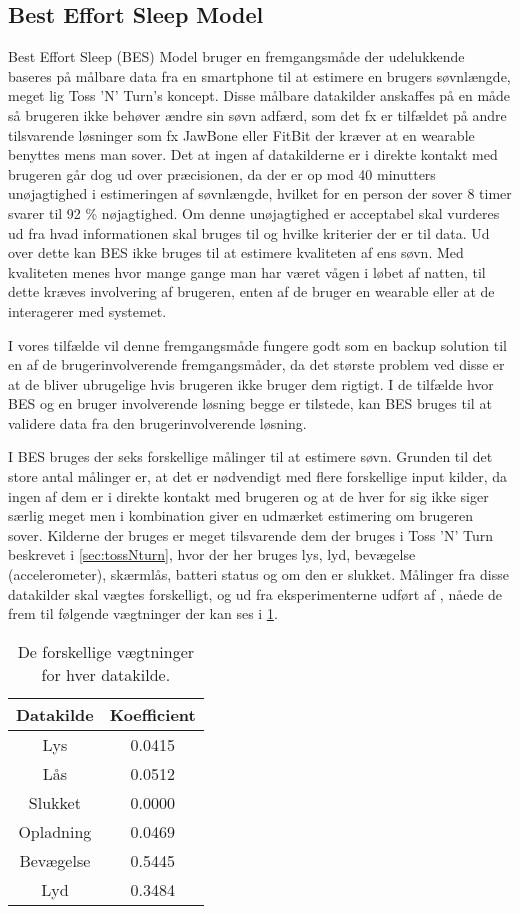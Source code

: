 \subsection{Best Effort Sleep Model}\label{sec:BES}
Best Effort Sleep (BES) Model \citet{6563918} bruger en fremgangsmåde der udelukkende baseres på målbare data fra en smartphone til at estimere en brugers søvnlængde, meget lig Toss 'N' Turn's koncept.
Disse målbare datakilder anskaffes på en måde så brugeren ikke behøver ændre sin søvn adfærd, som det fx er tilfældet på andre tilsvarende løsninger som fx JawBone eller FitBit der kræver at en wearable benyttes mens man sover.
Det at ingen af datakilderne er i direkte kontakt med brugeren går dog ud over præcisionen, da der er op mod 40 minutters unøjagtighed i estimeringen af søvnlængde, hvilket for en person der sover 8 timer svarer til 92 \% nøjagtighed.
Om denne unøjagtighed er acceptabel skal vurderes ud fra hvad informationen skal bruges til og hvilke kriterier der er til data.
Ud over dette kan BES ikke bruges til at estimere kvaliteten af ens søvn.
Med kvaliteten menes hvor mange gange man har været vågen i løbet af natten, til dette kræves involvering af brugeren, enten af de bruger en wearable eller at de interagerer med systemet.

I vores tilfælde vil denne fremgangsmåde fungere godt som en backup solution til en af de brugerinvolverende fremgangsmåder, da det største problem ved disse er at de bliver ubrugelige hvis brugeren ikke bruger dem rigtigt.
I de tilfælde hvor BES og en bruger involverende løsning begge er tilstede, kan BES bruges til at validere data fra den brugerinvolverende løsning. 

I BES bruges der seks forskellige målinger til at estimere søvn.
Grunden til det store antal målinger er, at det er nødvendigt med flere forskellige input kilder, da ingen af dem er i direkte kontakt med brugeren og at de hver for sig ikke siger særlig meget men i kombination giver en udmærket estimering om brugeren sover.
Kilderne der bruges er meget tilsvarende dem der bruges i Toss 'N' Turn beskrevet i \cref{sec:tossNturn}, hvor der her bruges lys, lyd, bevægelse (accelerometer), skærmlås, batteri status og om den er slukket.
Målinger fra disse datakilder skal vægtes forskelligt, og ud fra eksperimenterne udført af \citet{6563918}, nåede de frem til følgende vægtninger der kan ses i \cref{tab:vaegtninger}.

\begin{table}[h]
\centering
\begin{tabular}{|c|c|}
\hline Datakilde & Koefficient\\
\hline Lys & 0.0415 \\ 
\hline Lås & 0.0512 \\ 
\hline Slukket & 0.0000 \\ 
\hline Opladning & 0.0469 \\ 
\hline Bevægelse & 0.5445 \\ 
\hline Lyd & 0.3484 \\ 
\hline 
\end{tabular}
\caption{De forskellige vægtninger for hver datakilde.}
\label{tab:vaegtninger}
\end{table}

